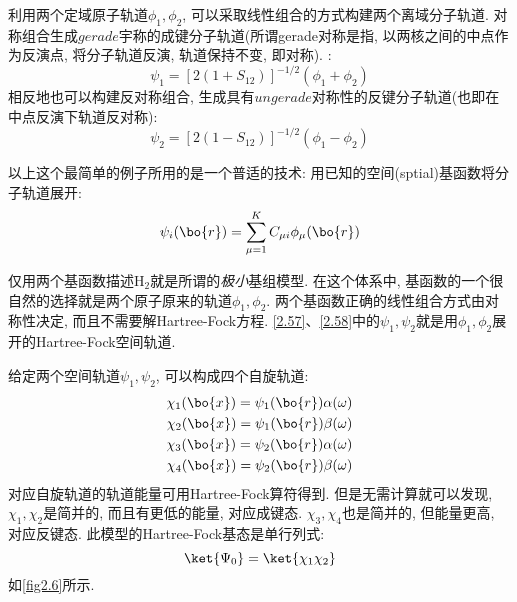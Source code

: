 利用两个定域原子轨道$\phi_1,\phi_2$, 
可以采取线性组合的方式构建两个离域分子轨道. 
对称组合生成$gerade$宇称的成键分子轨道(所谓gerade对称是指, 
以两核之间的中点作为反演点, 
将分子轨道反演, 
轨道保持不变, 
即对称).
:
\begin{equation}
\label{2.57}
\psi_1=[2(1+S_{12})]^{-1/2}(\phi_1+\phi_2)
\end{equation}
相反地也可以构建反对称组合, 
生成具有$ungerade$对称性的反键分子轨道(也即在中点反演下轨道反对称):
\begin{equation}
\label{2.58}
\psi_2=[2(1-S_{12})]^{-1/2}(\phi_1-\phi_2)
\end{equation}

以上这个最简单的例子所用的是一个普适的技术: 用已知的空间(sptial)基函数将分子轨道展开: 
\begin{equation}
\label{2.59}
\psi_i(\bo{r})=\sum_{\mu=1}^{K}C_{\mu i}\phi_{\mu}(\bo{r})
\end{equation} 

仅用两个基函数描述H$_2$就是所谓的\emph{极小}基组模型. 
在这个体系中, 
基函数的一个很自然的选择就是两个原子原来的轨道$\phi_1,\phi_2$. 
两个基函数正确的线性组合方式由对称性决定, 
而且不需要解Hartree-Fock方程. 
\autoref{2.57}、\autoref{2.58}中的$\psi_1,\psi_2$就是用$\phi_1,\phi_2$展开的Hartree-Fock空间轨道.


给定两个空间轨道$\psi_1,\psi_2$, 
可以构成四个自旋轨道:
\begin{equation}
\begin{split}
\chi_1(\bo{x})=\psi_1(\bo{r})\alpha(\omega)\\
\chi_2(\bo{x})=\psi_1(\bo{r})\beta(\omega)\\
\chi_3(\bo{x})=\psi_2(\bo{r})\alpha(\omega)\\
\chi_4(\bo{x})=\psi_2(\bo{r})\beta(\omega)
\end{split}
\label{2.60}
\end{equation}
对应自旋轨道的轨道能量可用Hartree-Fock算符得到. 
但是无需计算就可以发现, 
$\chi_1,\chi_2$是简并的, 
而且有更低的能量, 
对应成键态. 
$\chi_3,\chi_4$也是简并的, 
但能量更高, 
对应反键态. 
此模型的Hartree-Fock基态是单行列式:
\begin{equation}
\ket{\Psi_0}=\ket{\chi_1\chi_2}
\end{equation}
如\autoref{fig2.6}所示.

